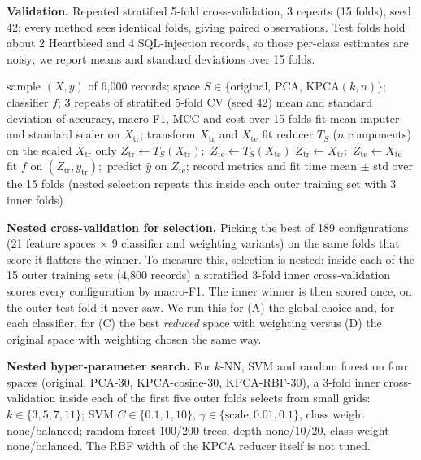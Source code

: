 \documentclass[runningheads]{llncs}
\begin{document}
\textbf{Validation.} Repeated stratified 5-fold cross-validation, 3 repeats (15 folds), seed 42; every method sees identical folds, giving paired observations. Test folds hold about 2 Heartbleed and 4 SQL-injection records, so those per-class estimates are noisy; we report means and standard deviations over 15 folds.

\begin{algorithm}[!t]
\caption{Fold-wise evaluation of one feature space $S$ and classifier $f$}\label{alg:cv}
\begin{algorithmic}[1]
\Require sample $(X,y)$ of 6,000 records; space $S\in\{$original, PCA, KPCA$(k,n)\}$; classifier $f$; 3 repeats of stratified 5-fold CV (seed 42)
\Ensure mean and standard deviation of accuracy, macro-F1, MCC and cost over 15 folds
 \State fit mean imputer and standard scaler on $X_{\mathrm{tr}}$; transform $X_{\mathrm{tr}}$ and $X_{\mathrm{te}}$
  \State fit reducer $T_S$ ($n$ components) on the scaled $X_{\mathrm{tr}}$ only
  \State $Z_{\mathrm{tr}}\gets T_S(X_{\mathrm{tr}})$;\ $Z_{\mathrm{te}}\gets T_S(X_{\mathrm{te}})$
 \Else
  \State $Z_{\mathrm{tr}}\gets X_{\mathrm{tr}}$;\ $Z_{\mathrm{te}}\gets X_{\mathrm{te}}$
 \EndIf
 \State fit $f$ on $(Z_{\mathrm{tr}},y_{\mathrm{tr}})$;\ predict $\hat{y}$ on $Z_{\mathrm{te}}$; record metrics and fit time
\EndFor
\State \Return mean $\pm$ std over the 15 folds (nested selection repeats this inside each outer training set with 3 inner folds)
\end{algorithmic}
\end{algorithm}

\textbf{Nested cross-validation for selection.} Picking the best of 189 configurations (21 feature spaces $\times$ 9 classifier and weighting variants) on the same folds that score it flatters the winner. To measure this, selection is nested: inside each of the 15 outer training sets (4{,}800 records) a stratified 3-fold inner cross-validation scores every configuration by macro-F1. The inner winner is then scored once, on the outer test fold it never saw. We run this for (A) the global choice and, for each classifier, for (C) the best \emph{reduced} space with weighting versus (D) the original space with weighting chosen the same way.

\textbf{Nested hyper-parameter search.} For $k$-NN, SVM and random forest on four spaces (original, PCA-30, KPCA-cosine-30, KPCA-RBF-30), a 3-fold inner cross-validation inside each of the first five outer folds selects from small grids: $k\in\{3,5,7,11\}$; SVM $C\in\{0.1,1,10\}$, $\gamma\in\{\text{scale},0.01,0.1\}$, class weight none/balanced; random forest 100/200 trees, depth none/10/20, class weight none/balanced. The RBF width of the KPCA reducer itself is not tuned.
\end{document}
